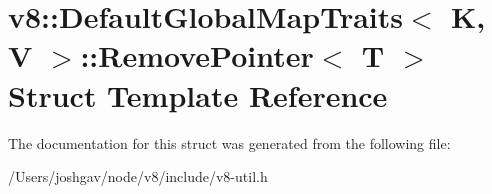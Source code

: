 \hypertarget{structv8_1_1_default_global_map_traits_1_1_remove_pointer}{}\section{v8\+:\+:Default\+Global\+Map\+Traits$<$ K, V $>$\+:\+:Remove\+Pointer$<$ T $>$ Struct Template Reference}
\label{structv8_1_1_default_global_map_traits_1_1_remove_pointer}


The documentation for this struct was generated from the following file\+:\begin{DoxyCompactItemize}
\item 
/\+Users/joshgav/node/v8/include/v8-\/util.\+h\end{DoxyCompactItemize}

